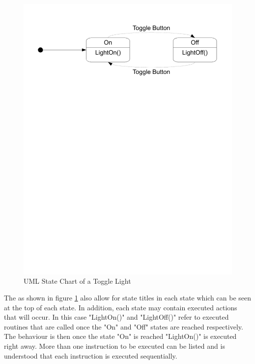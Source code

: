 \begin{figure}[htp]
    \centering
    \includegraphics[trim= 15mm 200mm 15mm 10mm, clip, width=\imgmedium]{./images/state_uml_light.pdf} 
    \caption{UML State Chart of a Toggle Light}
    \label{fig:state_uml_light}
\end{figure}


The \cite{UML2} as shown in figure \ref{fig:state_uml_light} also allow for state titles in each state which can be seen at the top of each state. In addition, each state may contain executed actions that will occur. In this case "LightOn()" and "LightOff()" refer to executed routines that are called once the "On" and "Off" states are reached respectively. The behaviour is then once the state "On" is reached "LightOn()" is executed right away. More than one instruction to be executed can be listed and is understood that each instruction is executed sequentially\cite{UML2}.

